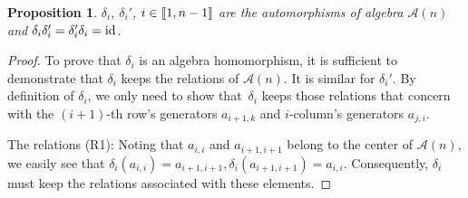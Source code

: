 \documentclass[10pt,a4paper]{amsart}
\numberwithin{equation}{section}
\def\id{{\rm id}}
\def\lrb#1{\left(#1\right)}
\def\d{\delta}
\def\A{\mathscr{A}}
\def\lbb#1{\left[\kern-0.15em\left[ {#1} \right] \kern-0.15em\right]}
\newtheorem{Proposition}[Theorem]{Proposition}
 { \theoremstyle{definition}
\newtheorem{Definition}[Theorem]{Definition}
\newtheorem{Note}[Theorem]{Note}
\newtheorem{Example}[Theorem]{Example}
\newtheorem{Remark}[Theorem]{Remark} }
\begin{document}
\begin{Proposition}
$\d_i$, $\d_i'$, $i \in \lbb{1,n-1}$ are the automorphisms of algebra $\A(n)$ and $\d_i\d_i'=\d_i'\d_i\allowbreak=\id$.
\end{Proposition}
\begin{proof}
To prove that $\d_i$ is an algebra homomorphism, it is sufficient to demonstrate that $\d_i$ keeps the relations of $\A(n).$
It is similar for $\d_i'$.
By definition of $\d_i$, we only need to show that~$\d_i$ keeps those relations that concern with the $(i+1)$-th row's generators $a_{i+1, k}$ and $i$-column's generators $a_{j,i}$.

The relations (R1):
Noting that $a_{i,i}$ and $a_{i+1,i+1}$ belong to the center of $\A(n)$, we easily see that
$\d_i\lrb{a_{i,i}}=a_{i+1,i+1}, \d_i\lrb{a_{i+1,i+1}}=a_{i,i}.$
 Consequently, $\d_i$ must keep the relations associated with these elements.


\end{proof}
\end{document}
